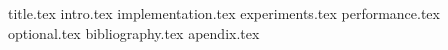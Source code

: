 \documentclass[12pt]{article}
\newcommand*{\sectiondir}{sections/}
\begin{document}
	{title.tex}
	\tableofcontents
	\newpage
	{intro.tex}
	{implementation.tex}
	{experiments.tex}
	{performance.tex}
	{optional.tex}
	{bibliography.tex}
	\newpage
	{apendix.tex}
\end{document}
